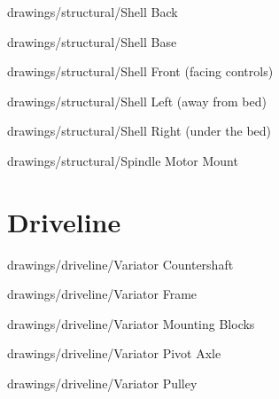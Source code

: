 
            {drawings/structural/Shell Back}


            {drawings/structural/Shell Base}


            {drawings/structural/Shell Front (facing controls)}


            {drawings/structural/Shell Left (away from bed)}


            {drawings/structural/Shell Right (under the bed)}


            {drawings/structural/Spindle Motor Mount}


\section{Driveline}


            {drawings/driveline/Variator Countershaft}


            {drawings/driveline/Variator Frame}


            {drawings/driveline/Variator Mounting Blocks}


            {drawings/driveline/Variator Pivot Axle}


            {drawings/driveline/Variator Pulley}

